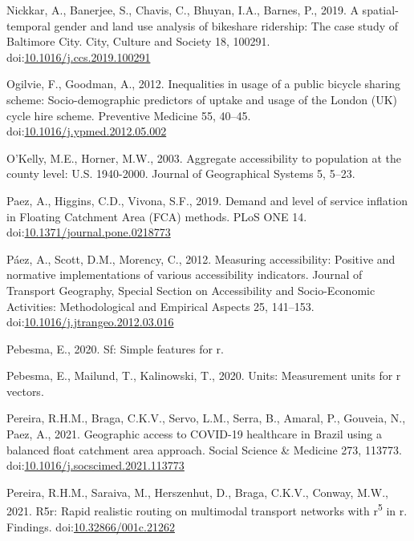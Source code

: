 \documentclass[]{elsarticle} %
\begin{document}
\leavevmode\hypertarget{ref-nickkarSpatialtemporalGenderLand2019}{}%
Nickkar, A., Banerjee, S., Chavis, C., Bhuyan, I.A., Barnes, P., 2019. A
spatial-temporal gender and land use analysis of bikeshare ridership:
The case study of Baltimore City. City, Culture and Society 18, 100291.
doi:\href{https://doi.org/10.1016/j.ccs.2019.100291}{10.1016/j.ccs.2019.100291}

\leavevmode\hypertarget{ref-ogilvieInequalitiesUsagePublic2012}{}%
Ogilvie, F., Goodman, A., 2012. Inequalities in usage of a public
bicycle sharing scheme: Socio-demographic predictors of uptake and usage
of the London (UK) cycle hire scheme. Preventive Medicine 55, 40--45.
doi:\href{https://doi.org/10.1016/j.ypmed.2012.05.002}{10.1016/j.ypmed.2012.05.002}

\leavevmode\hypertarget{ref-okelly2003aggregate}{}%
O'Kelly, M.E., Horner, M.W., 2003. Aggregate accessibility to population
at the county level: U.S. 1940-2000. Journal of Geographical Systems 5,
5--23.

\leavevmode\hypertarget{ref-paezDemandLevelService2019}{}%
Paez, A., Higgins, C.D., Vivona, S.F., 2019. Demand and level of service
inflation in Floating Catchment Area (FCA) methods. PLoS ONE 14.
doi:\href{https://doi.org/10.1371/journal.pone.0218773}{10.1371/journal.pone.0218773}

\leavevmode\hypertarget{ref-paezMeasuringAccessibilityPositive2012}{}%
Páez, A., Scott, D.M., Morency, C., 2012. Measuring accessibility:
Positive and normative implementations of various accessibility
indicators. Journal of Transport Geography, Special Section on
Accessibility and Socio-Economic Activities: Methodological and
Empirical Aspects 25, 141--153.
doi:\href{https://doi.org/10.1016/j.jtrangeo.2012.03.016}{10.1016/j.jtrangeo.2012.03.016}

\leavevmode\hypertarget{ref-R-sf}{}%
Pebesma, E., 2020. Sf: Simple features for r.

\leavevmode\hypertarget{ref-R-units}{}%
Pebesma, E., Mailund, T., Kalinowski, T., 2020. Units: Measurement units
for r vectors.

\leavevmode\hypertarget{ref-pereiraGeographicAccessCOVID192021}{}%
Pereira, R.H.M., Braga, C.K.V., Servo, L.M., Serra, B., Amaral, P.,
Gouveia, N., Paez, A., 2021. Geographic access to COVID-19 healthcare in
Brazil using a balanced float catchment area approach. Social Science \&
Medicine 273, 113773.
doi:\href{https://doi.org/10.1016/j.socscimed.2021.113773}{10.1016/j.socscimed.2021.113773}

\leavevmode\hypertarget{ref-Pereira2021r5r}{}%
Pereira, R.H.M., Saraiva, M., Herszenhut, D., Braga, C.K.V., Conway,
M.W., 2021. R5r: Rapid realistic routing on multimodal transport
networks with r\textsuperscript{5} in r. Findings.
doi:\href{https://doi.org/10.32866/001c.21262}{10.32866/001c.21262}
\end{document}
